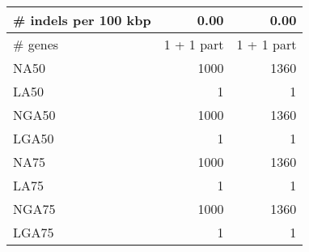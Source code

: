 \begin{table}[ht]
\begin{center}
\begin{tabular}{|l*{2}{|r}|}
\# indels per 100 kbp & 0.00 & 0.00 \\ \hline
\# genes & 1 + 1 part & 1 + 1 part \\ \hline
NA50 & 1000 & 1360 \\ \hline
LA50 & 1 & 1 \\ \hline
NGA50 & 1000 & 1360 \\ \hline
LGA50 & 1 & 1 \\ \hline
NA75 & 1000 & 1360 \\ \hline
LA75 & 1 & 1 \\ \hline
NGA75 & 1000 & 1360 \\ \hline
LGA75 & 1 & 1 \\ \hline
\end{tabular}
\end{center}
\end{table}
